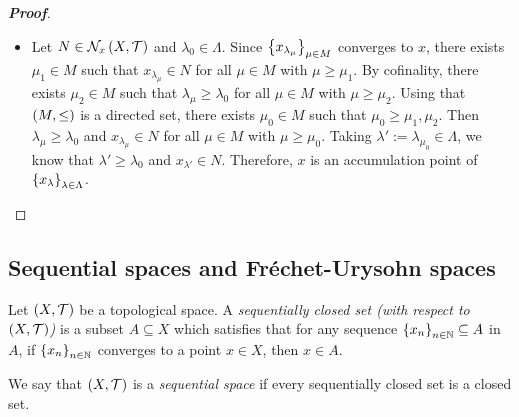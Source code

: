 \begin{proposition}
\begin{proof}[\rm\textbf{Proof}]
\begin{itemize}
      It remains to be proven that $\set{x_{\mu}}_{\mu\in M}\subseteq X$ is a subnet in $X$ of $\set{x_{\lambda}}_{\lambda\in\Lambda}$.
      
      It is easy to notice that, if $\mu_1:=\pr{N_1,\lambda_1},\mu_2:=\pr{N_2,\lambda_2}\in M$ with $\mu_1\leq\mu_2$, then $f\pr{\mu_1}=\lambda_1\leq\lambda_2=f\pr{\mu_2}$.

      Let $\lambda_0\in\Lambda$ and take $N_0:=X\in\mathcal{N}_x\pr{X,\mathcal{T}}$. Observe that $x_{\lambda_0}\in N_0$. Then $\mu_0:=\pr{N_0,\lambda_0}\in M$. If $\mu:=\pr{N',\lambda'}\in M$ is such that $\mu\geq\mu_0$, then $f\pr{\mu}=\lambda'\geq\lambda_0$.
      
      Therefore, $\set{x_{\mu}}_{\mu\in M}\subseteq X$ is a subnet in $X$ of $\set{x_{\lambda}}_{\lambda\in\Lambda}$.

      \item[\boxed{\Leftarrow}] Let $N\in\mathcal{N}_x\left(X,\mathcal{T}\right)$ and $\lambda_0\in\Lambda$. Since $\left\{x_{\lambda_{\mu}}\right\}_{\mu\in M}$ converges to $x$, there exists $\mu_1\in M$ such that $x_{\lambda_{\mu}}\in N$ for all $\mu\in M$ with $\mu\geq\mu_1$. By cofinality, there exists $\mu_2\in M$ such that $\lambda_\mu\geq\lambda_0$ for all $\mu\in M$ with $\mu\geq\mu_2$. Using that $\left(M,\leq\right)$ is a directed set, there exists $\mu_0\in M$ such that $\mu_0\geq\mu_1,\mu_2$. Then $\lambda_\mu\geq\lambda_0$ and $x_{\lambda_{\mu}}\in N$ for all $\mu\in M$ with $\mu\geq\mu_0$. Taking $\lambda':=\lambda_{\mu_0}\in\Lambda$, we know that $\lambda'\geq\lambda_0$ and $x_{\lambda'}\in N$. Therefore, $x$ is an accumulation point of $\set{x_{\lambda}}_{\lambda\in\Lambda}$.
    \end{itemize}
  \end{proof}
\end{proposition}

\subsection{Sequential spaces and Fréchet-Urysohn spaces}

\begin{definition}
  Let $\left(X,\mathcal{T}\right)$ be a topological space. A \textit{sequentially closed set (with respect to $\left(X,\mathcal{T}\right)$)} is a subset $A\subseteq X$ which satisfies that for any sequence $\left\{x_n\right\}_{n\in\mathbb{N}}\subseteq A$ in $A$, if $\left\{x_n\right\}_{n\in\mathbb{N}}$ converges to a point $x\in X$, then $x\in A$. 

  We say that $\left(X,\mathcal{T}\right)$ is a \textit{sequential space} if every sequentially closed set is a closed set.
\end{definition}

